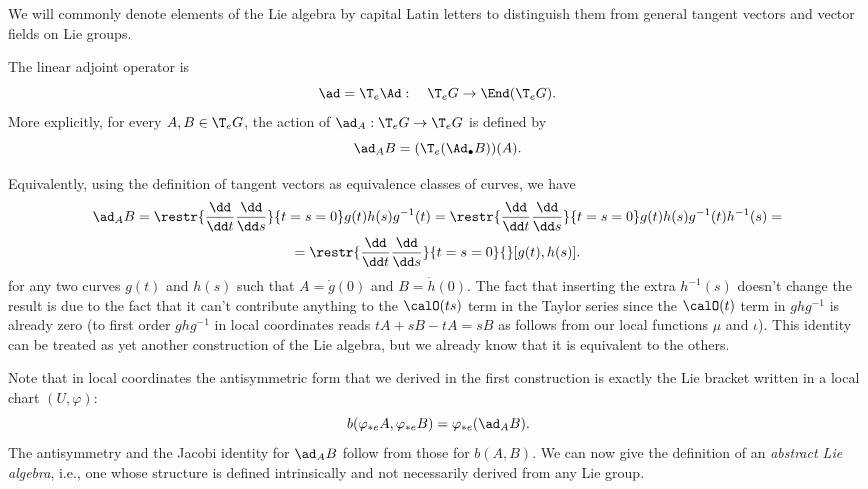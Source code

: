 We will commonly denote elements of the Lie algebra by capital Latin letters to distinguish them from general tangent vectors and vector fields on Lie groups.

\begin{defn}
    The linear adjoint operator is
    \[\ad=\T_e \Ad: \quad \T_eG\to \End(\T_eG).\]
    More explicitly, for every $A,B\in \T_eG$, the action of $\ad_A:\T_eG\to \T_eG$ is defined by
    \[\ad_A B=(\T_e(\Ad_\bullet B))(A).\]
\end{defn}

Equivalently, using the definition of tangent vectors as equivalence classes of curves, we have
\begin{multline}
    \ad_A B=\restr{\frac{\dd}{\dd t} \frac{\dd}{\dd s}}{t=s=0}g(t)h(s)g^{-1}(t)=\restr{\frac{\dd}{\dd t} \frac{\dd}{\dd s}}{t=s=0}g(t)h(s)g^{-1}(t)h^{-1}(s)=\\=\restr{\frac{\dd}{\dd t} \frac{\dd}{\dd s}}{t=s=0}{} [g(t),h(s)].\label{30071}
\end{multline}
for any two curves $g(t)$ and $h(s)$ such that $A=\dot g(0)$ and $B=\dot h(0)$. The fact that inserting the extra $h^{-1}(s)$ doesn't change the result is due to the fact that it can't contribute anything to the $\calO(ts)$ term in the Taylor series since the $\calO(t)$ term in $ghg^{-1}$ is already zero (to first order $ghg^{-1}$ in local coordinates reads $tA+sB-tA=sB$ as follows from our local functions $\mu$ and $\iota$). This identity can be treated as yet another construction of the Lie algebra, but we already know that it is equivalent to the others.

Note that in local coordinates the antisymmetric form that we derived in the first construction is exactly the Lie bracket written in a local chart $(U,\varphi)$:
\[b(\varphi_{\ast e} A,\varphi_{\ast e} B)=\varphi_{\ast e}(\ad_A B).\]
The antisymmetry and the Jacobi identity for $\ad_A B$ follow from those for $b(A,B)$. We can now give the definition of an \emph{abstract Lie algebra}, i.e., one whose structure is defined intrinsically and not necessarily derived from any Lie group.

